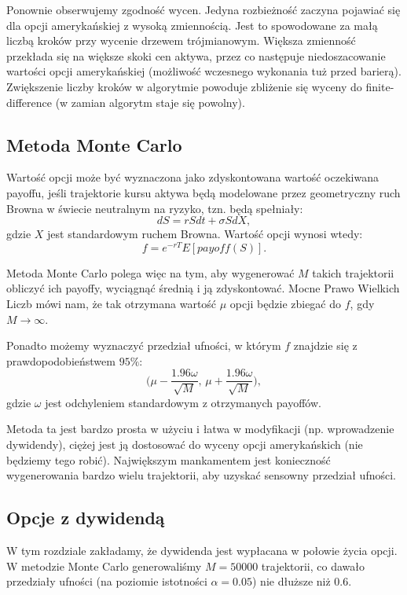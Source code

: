 \documentclass[12pt]{article}
\begin{document}
Ponownie obserwujemy zgodność wycen. Jedyna rozbieżność zaczyna pojawiać się dla opcji amerykańskiej z wysoką zmiennością. Jest to spowodowane za małą liczbą kroków przy wycenie drzewem trójmianowym. Większa zmienność przekłada się na większe skoki cen aktywa, przez co następuje niedoszacowanie wartości opcji amerykańskiej (możliwość wczesnego wykonania tuż przed barierą). Zwiększenie liczby kroków w algorytmie powoduje zbliżenie się wyceny do finite-difference (w zamian algorytm staje się powolny).

\subsection{Metoda Monte Carlo}

Wartość opcji może być wyznaczona jako zdyskontowana wartość oczekiwana payoffu, jeśli trajektorie kursu aktywa będą modelowane przez geometryczny ruch Browna w świecie neutralnym na ryzyko, tzn. będą spełniały: \[dS=rSdt+\sigma SdX,\] gdzie \(X\) jest standardowym ruchem Browna. Wartość opcji wynosi wtedy: \[f=e^{-rT}E[payoff(S)].\]

Metoda Monte Carlo polega więc na tym, aby wygenerować \(M\) takich trajektorii obliczyć ich payoffy, wyciągnąć średnią i ją zdyskontować. Mocne Prawo Wielkich Liczb mówi nam, że tak otrzymana wartość \(\mu\) opcji będzie zbiegać do \(f\), gdy \(M\rightarrow \infty\). 

Ponadto możemy wyznaczyć przedział ufności, w którym \(f\) znajdzie się z prawdopodobieństwem \(95\%\): \[\Big( \mu - \frac{1.96\omega}{\sqrt{M}},\, \mu + \frac{1.96\omega}{\sqrt{M}}\Big),\] gdzie \(\omega\) jest odchyleniem standardowym z otrzymanych payoffów.

Metoda ta jest bardzo prosta w użyciu i łatwa w modyfikacji (np. wprowadzenie dywidendy), ciężej jest ją dostosować do wyceny opcji amerykańskich (nie będziemy tego robić). Największym mankamentem jest konieczność wygenerowania bardzo wielu trajektorii, aby uzyskać sensowny przedział ufności.

\subsection{Opcje z dywidendą}
W tym rozdziale zakładamy, że dywidenda jest wypłacana w połowie życia opcji.\\

W metodzie Monte Carlo generowaliśmy \(M=50000\) trajektorii, co dawało przedziały ufności (na poziomie istotności \(\alpha=0.05\)) nie dłuższe niż \(0.6\).
\end{document}
